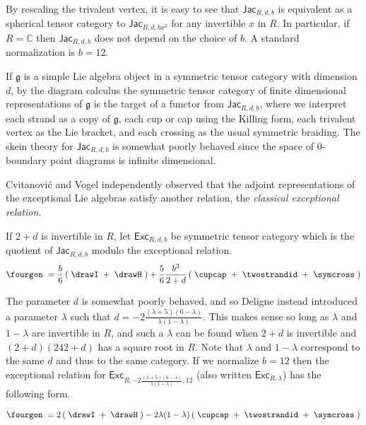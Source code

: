 \documentclass[12pt]{amsart}
\begin{document}
By rescaling the trivalent vertex, it is easy to see that
$\mathsf{Jac}_{R,d,b}$ is equivalent as a spherical tensor category to
$\mathsf{Jac}_{R,d,bx^2}$ for any invertible $x$ in $R$.  In particular, if $R
= \mathbb{C}$ then $\mathsf{Jac}_{R,d,b}$ does not depend on the choice of
$b$.  A standard normalization is $b=12$.

If $\mathfrak{g}$ is a simple Lie algebra object in a symmetric tensor
category with dimension $d$, by the diagram calculus  the symmetric tensor
category of finite dimensional representations of $\mathfrak{g}$ is the target
of a functor from $\mathsf{Jac}_{R,d,b}$, where we interpret each strand as a
copy of $\mathfrak{g}$, each cup or cap using the Killing form, each trivalent
vertex as the Lie bracket, and each crossing as the usual symmetric braiding.
The skein theory for $\mathsf{Jac}_{R,d,b}$ is somewhat poorly behaved
since the space of $0$-boundary
point diagrams is infinite dimensional.

Cvitanović \cite{MR2418111} and Vogel \cite{MR2769234}
independently observed that the adjoint
representations of the exceptional Lie algebras satisfy another relation, the
\emph{classical exceptional relation}.

\begin{definition}
If $2+d$ is invertible in $R$, let $\mathsf{Exc}_{R,d,b}$ be symmetric tensor category which is the quotient of 
$\mathsf{Jac}_{R,d,b}$ modulo the exceptional relation.
\begin{equation}
\fourgon\; = \frac{b}{6} \left(\;\drawI\; + \;\drawH\; \right)
 + \frac{5}{6}\frac{b^2}{2+d} \left( \;\cupcap\; + \;\twostrandid\; + \;\symcross\; \right)
\label{eq:classical-except}
\end{equation}
\end{definition}

The parameter $d$ is somewhat poorly behaved, and so Deligne instead
introduced a parameter $\lambda$ such that $d = -2
\frac{(\lambda+5)(6-\lambda)}{\lambda(1-\lambda)}$.  This makes sense so long
as $\lambda$ and $1-\lambda$ are invertible in $R$, and such a $\lambda$ can
be found when $2+d$ is invertible and $(2+d)(242+d)$ has a square root in $R$.
Note that $\lambda$ and $1-\lambda$ correspond to the same $d$ and thus to the
same category.  If we normalize $b=12$ then the exceptional relation for
$\mathsf{Exc}_{R,-2   \frac{(\lambda+5)(6-\lambda)}{\lambda(1-\lambda)},12}$
(also written $\mathsf{Exc}_{R,\lambda}$) has the following form.

\begin{equation}
\fourgon\; = 2\left(\;\drawI\; + \;\drawH\;\right)
 - 2\lambda(1-\lambda) \left( \;\cupcap\; + \;\twostrandid\; + \;\symcross\; \right)
\label{eq:classical-except-2}
\end{equation}
\end{document}

